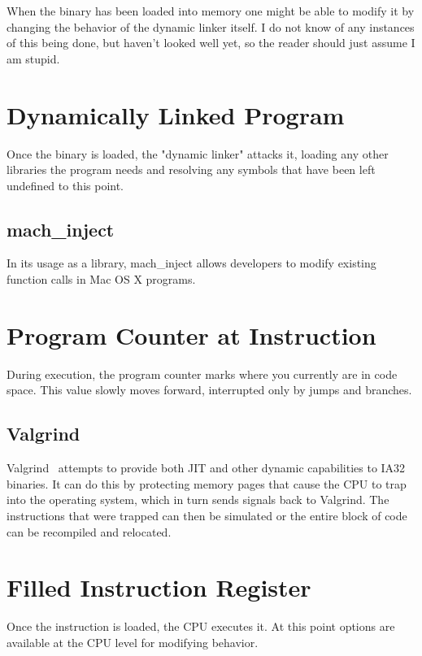 \documentclass[12pt]{article}
\begin{document}
When the binary has been loaded into memory one might be able to modify it by changing the behavior of the dynamic linker itself. I do not know of any instances of this being done, but haven't looked well yet, so the reader should just assume I am stupid.

\section{Dynamically Linked Program}

Once the binary is loaded, the "dynamic linker" attacks it, loading any other libraries the program needs and resolving any symbols that have been left undefined to this point.

\subsection{mach\_inject}

In its usage as a library, mach\_inject allows developers to modify existing function calls in Mac OS X programs.

\section{Program Counter at Instruction}

During execution, the program counter marks where you currently are in code space. This value slowly moves forward, interrupted only by jumps and branches.

\subsection{Valgrind}

Valgrind~\cite{valgrind} attempts to provide both JIT and other dynamic capabilities to IA32 binaries. It can do this by protecting memory pages that cause the CPU to trap into the operating system, which in turn sends signals back to Valgrind. The instructions that were trapped can then be simulated or the entire block of code can be recompiled and relocated.

\section{Filled Instruction Register}

Once the instruction is loaded, the CPU executes it. At this point options are available at the CPU level for modifying behavior.
\end{document}
